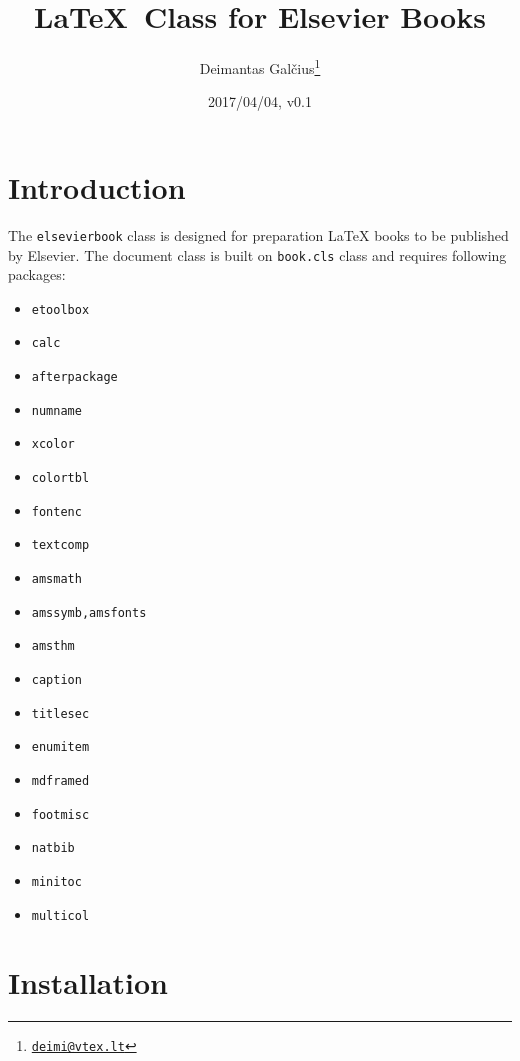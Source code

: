 \documentclass{ltxdoc}
\def\file#1{\texttt{#1}}
\begin{document}
\title{\LaTeX\ Class for Elsevier Books}
\author{Deimantas Gal\v{c}ius\footnote{\href{mailto:deimi@vtex.lt}{\texttt{deimi@vtex.lt}}}}
\date{2017/04/04, v0.1}
\maketitle
{}

\tableofcontents

\section{Introduction}

The \file{elsevierbook} class is designed for preparation \LaTeX{} books to be published by Elsevier. 
The document class is built on \file{book.cls} class and requires following packages:

\begin{multicols}{2}
\begin{itemize}
\item \file{etoolbox}
\item \file{calc}
\item \file{afterpackage}
\item \file{numname}
\item \file{xcolor}
\item \file{colortbl}
\item \file{fontenc}
\item \file{textcomp}
\item \file{amsmath}
\item \file{amssymb,amsfonts}
\item \file{amsthm}
\item \file{caption}
\item \file{titlesec}
\item \file{enumitem}
\item \file{mdframed}
\item \file{footmisc}
\item \file{natbib}
\item \file{minitoc}
\item \file{multicol}
\end{itemize}
\end{multicols}

\section{Installation}
\end{document}

